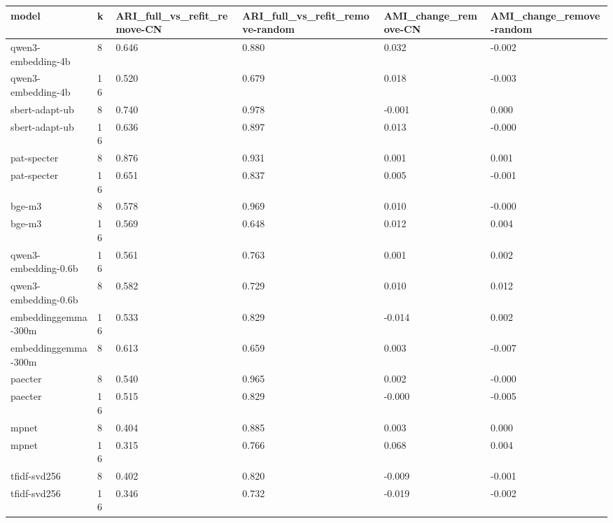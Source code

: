 \begin{tabular}{llllll}
\toprule
model & k & ARI\_full\_vs\_refit\_remove-CN & ARI\_full\_vs\_refit\_remove-random & AMI\_change\_remove-CN & AMI\_change\_remove-random \\
\midrule
qwen3-embedding-4b & 8 & 0.646 & 0.880 & 0.032 & -0.002 \\
qwen3-embedding-4b & 16 & 0.520 & 0.679 & 0.018 & -0.003 \\
sbert-adapt-ub & 8 & 0.740 & 0.978 & -0.001 & 0.000 \\
sbert-adapt-ub & 16 & 0.636 & 0.897 & 0.013 & -0.000 \\
pat-specter & 8 & 0.876 & 0.931 & 0.001 & 0.001 \\
pat-specter & 16 & 0.651 & 0.837 & 0.005 & -0.001 \\
bge-m3 & 8 & 0.578 & 0.969 & 0.010 & -0.000 \\
bge-m3 & 16 & 0.569 & 0.648 & 0.012 & 0.004 \\
qwen3-embedding-0.6b & 16 & 0.561 & 0.763 & 0.001 & 0.002 \\
qwen3-embedding-0.6b & 8 & 0.582 & 0.729 & 0.010 & 0.012 \\
embeddinggemma-300m & 16 & 0.533 & 0.829 & -0.014 & 0.002 \\
embeddinggemma-300m & 8 & 0.613 & 0.659 & 0.003 & -0.007 \\
paecter & 8 & 0.540 & 0.965 & 0.002 & -0.000 \\
paecter & 16 & 0.515 & 0.829 & -0.000 & -0.005 \\
mpnet & 8 & 0.404 & 0.885 & 0.003 & 0.000 \\
mpnet & 16 & 0.315 & 0.766 & 0.068 & 0.004 \\
tfidf-svd256 & 8 & 0.402 & 0.820 & -0.009 & -0.001 \\
tfidf-svd256 & 16 & 0.346 & 0.732 & -0.019 & -0.002 \\
\bottomrule
\end{tabular}
